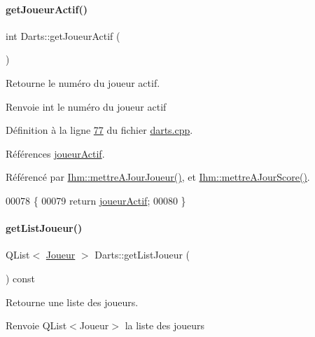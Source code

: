 \paragraph{\texorpdfstring{get\+Joueur\+Actif()}{getJoueurActif()}}
{\footnotesize\ttfamily int Darts\+::get\+Joueur\+Actif (\begin{DoxyParamCaption}{ }\end{DoxyParamCaption})}



Retourne le numéro du joueur actif. 

\begin{DoxyReturn}{Renvoie}
int le numéro du joueur actif 
\end{DoxyReturn}


Définition à la ligne \hyperlink{darts_8cpp_source_l00077}{77} du fichier \hyperlink{darts_8cpp_source}{darts.\+cpp}.



Références \hyperlink{darts_8h_source_l00076}{joueur\+Actif}.



Référencé par \hyperlink{ihm_8cpp_source_l00242}{Ihm\+::mettre\+A\+Jour\+Joueur()}, et \hyperlink{ihm_8cpp_source_l00141}{Ihm\+::mettre\+A\+Jour\+Score()}.


\begin{DoxyCode}
00078 \{
00079     \textcolor{keywordflow}{return} \hyperlink{class_darts_a68fb01b9aad6502e4429dfbf2a72d50b}{joueurActif};
00080 \}
\end{DoxyCode}
\mbox{\label{class_darts_a0525b09703d3461bf5570197354743c3}} 
\paragraph{\texorpdfstring{get\+List\+Joueur()}{getListJoueur()}}
{\footnotesize\ttfamily Q\+List$<$ \hyperlink{class_joueur}{Joueur} $>$ Darts\+::get\+List\+Joueur (\begin{DoxyParamCaption}{ }\end{DoxyParamCaption}) const}



Retourne une liste des joueurs. 

\begin{DoxyReturn}{Renvoie}
Q\+List$<$\+Joueur$>$ la liste des joueurs 
\end{DoxyReturn}


